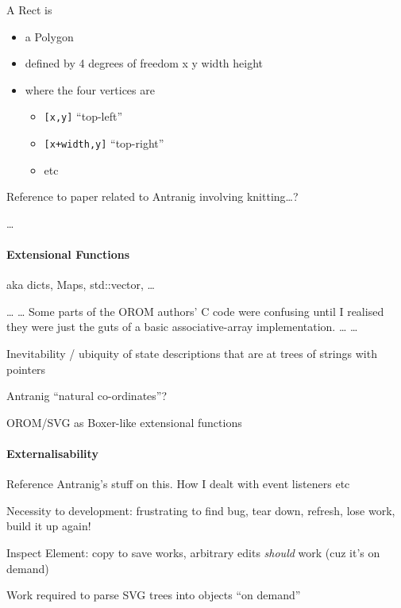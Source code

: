 \documentclass[english,submission]{programming}
\begin{document}
A Rect is

\begin{itemize}
\tightlist
\item
  a Polygon
\item
  defined by 4 degrees of freedom x y width height
\item
  where the four vertices are

  \begin{itemize}
  \tightlist
  \item
    \texttt{{[}x,y{]}} ``top-left''
  \item
    \texttt{{[}x+width,y{]}} ``top-right''
  \item
    etc
  \end{itemize}
\end{itemize}

Reference to paper related to Antranig involving knitting\ldots{}?

\ldots{}

\hypertarget{extensional-functions}{%
\paragraph{Extensional Functions}\label{extensional-functions}}

aka dicts, Maps, std::vector, \ldots{}

\ldots{} \ldots{} Some parts of the OROM authors' C code were confusing
until I realised they were just the guts of a basic associative-array
implementation. \ldots{} \ldots{}

Inevitability / ubiquity of state descriptions that are at trees of
strings with pointers

Antranig ``natural co-ordinates''?

OROM/SVG as Boxer-like extensional functions

\hypertarget{externalisability}{%
\paragraph{Externalisability}\label{externalisability}}

Reference Antranig's stuff on this. How I dealt with event listeners etc

Necessity to development: frustrating to find bug, tear down, refresh,
lose work, build it up again!

Inspect Element: copy to save works, arbitrary edits \emph{should} work
(cuz it's on demand)

Work required to parse SVG trees into objects ``on demand''
\end{document}

